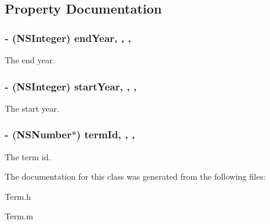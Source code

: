 \subsection{Property Documentation}
\hypertarget{interface_term_a3143ae8c527f7ca31d687a60742d908b}{
\subsubsection[{end\+Year}]{\setlength{\rightskip}{0pt plus 5cm}-\/ (N\+S\+Integer) end\+Year\hspace{0.3cm}{\ttfamily [read]}, {\ttfamily [write]}, {\ttfamily [nonatomic]}, {\ttfamily [assign]}}}\label{interface_term_a3143ae8c527f7ca31d687a60742d908b}
The end year. \hypertarget{interface_term_a28f6215d7c7ae2f56b9fb2299ef586f8}{
\subsubsection[{start\+Year}]{\setlength{\rightskip}{0pt plus 5cm}-\/ (N\+S\+Integer) start\+Year\hspace{0.3cm}{\ttfamily [read]}, {\ttfamily [write]}, {\ttfamily [nonatomic]}, {\ttfamily [assign]}}}\label{interface_term_a28f6215d7c7ae2f56b9fb2299ef586f8}
The start year. \hypertarget{interface_term_a1beacd986e807047abb0da06dd10e5fa}{
\subsubsection[{term\+Id}]{\setlength{\rightskip}{0pt plus 5cm}-\/ (N\+S\+Number$\ast$) term\+Id\hspace{0.3cm}{\ttfamily [read]}, {\ttfamily [write]}, {\ttfamily [nonatomic]}, {\ttfamily [assign]}}}\label{interface_term_a1beacd986e807047abb0da06dd10e5fa}
The term id. 

The documentation for this class was generated from the following files\+:\begin{DoxyCompactItemize}
\item 
Term.\+h\item 
Term.\+m\end{DoxyCompactItemize}
